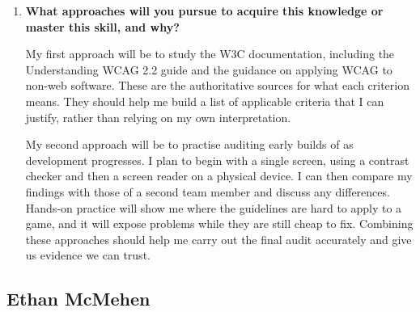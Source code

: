 \documentclass[10pt,titlepage]{article}
\begin{document}
\begin{enumerate}
    \item \textbf{What approaches will you pursue to acquire this
    knowledge or master this skill, and why?}

    My first approach will be to study the W3C documentation, including the
    Understanding WCAG 2.2 guide and the guidance on applying WCAG to non-web
    software. These are the authoritative sources for what each criterion means.
    They should help me build a list of applicable criteria that I can justify,
    rather than relying on my own interpretation.

    My second approach will be to practise auditing early builds of \progname{}
    as development progresses. I plan to begin with a single screen, using a
    contrast checker and then a screen reader on a physical device. I can then
    compare my findings with those of a second team member and discuss any
    differences. Hands-on practice will show me where the guidelines are hard to
    apply to a game, and it will expose problems while they are still cheap to
    fix. Combining these approaches should help me carry out the final audit
    accurately and give us evidence we can trust.

\end{enumerate}

\subsection*{Ethan McMehen}
\end{document}
